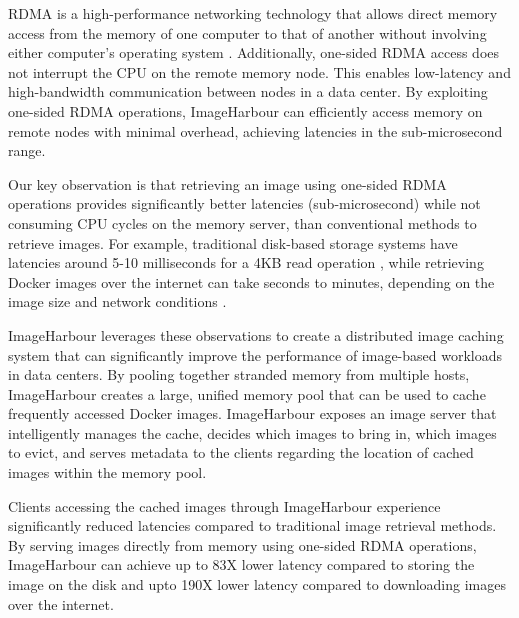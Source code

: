RDMA is a high-performance networking technology that allows direct memory access from the memory of one computer to that of another without involving either computer's operating system \cite{kalia2016design}. Additionally, one-sided RDMA access does not interrupt the CPU on the remote memory node. This enables low-latency and high-bandwidth communication between nodes in a data center. By exploiting one-sided RDMA operations, ImageHarbour can efficiently access memory on remote nodes with minimal overhead, achieving latencies in the sub-microsecond range. 

Our key observation is that retrieving an image using one-sided RDMA operations provides significantly better latencies (sub-microsecond) while not consuming CPU cycles on the memory server, than conventional methods to retrieve images. For example, traditional disk-based storage systems have latencies around 5-10 milliseconds for a 4KB read operation \cite{yang2014don}, while retrieving Docker images over the internet can take seconds to minutes, depending on the image size and network conditions \cite{harter2016slacker}.

ImageHarbour leverages these observations to create a distributed image caching system that can significantly improve the performance of image-based workloads in data centers. By pooling together stranded memory from multiple hosts, ImageHarbour creates a large, unified memory pool that can be used to cache frequently accessed Docker images. ImageHarbour exposes an image server that intelligently manages the cache, decides which images to bring in, which images to evict, and serves metadata to the clients regarding the location of cached images within the memory pool.

Clients accessing the cached images through ImageHarbour experience significantly reduced latencies compared to traditional image retrieval methods. By serving images directly from memory using one-sided RDMA operations, ImageHarbour can achieve up to 83X lower latency compared to storing the image on the disk and upto 190X lower latency compared to downloading images over the internet.
